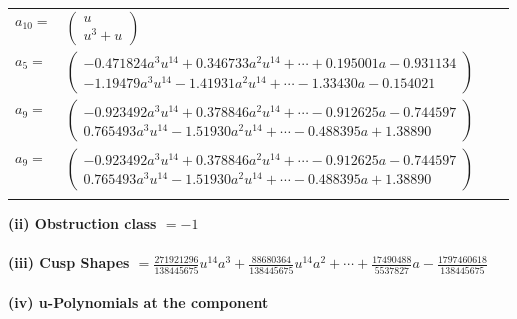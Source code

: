 \documentclass[1p]{elsarticle_modified}
\theoremstyle{definition}
\begin{document}
\begin{tabular}{m{7pt} m{180pt} m{7pt} m{180pt} }
\flushright $a_{10}=$&$\begin{pmatrix}u\\u^3+u\end{pmatrix}$ \\
\flushright $a_{5}=$&$\begin{pmatrix}-0.471824 a^{3} u^{14}+0.346733 a^{2} u^{14}+\cdots+0.195001 a-0.931134\\-1.19479 a^{3} u^{14}-1.41931 a^{2} u^{14}+\cdots-1.33430 a-0.154021\end{pmatrix}$ \\
\flushright $a_{9}=$&$\begin{pmatrix}-0.923492 a^{3} u^{14}+0.378846 a^{2} u^{14}+\cdots-0.912625 a-0.744597\\0.765493 a^{3} u^{14}-1.51930 a^{2} u^{14}+\cdots-0.488395 a+1.38890\end{pmatrix}$\\ \flushright $a_{9}=$&$\begin{pmatrix}-0.923492 a^{3} u^{14}+0.378846 a^{2} u^{14}+\cdots-0.912625 a-0.744597\\0.765493 a^{3} u^{14}-1.51930 a^{2} u^{14}+\cdots-0.488395 a+1.38890\end{pmatrix}$\\&\end{tabular}
\flushleft \textbf{(ii) Obstruction class $= -1$}\\~\\
\flushleft \textbf{(iii) Cusp Shapes $= \frac{271921296}{138445675} u^{14} a^3+\frac{88680364}{138445675} u^{14} a^2+\cdots+\frac{17490488}{5537827} a-\frac{1797460618}{138445675}$}\\~\\
\newpage\renewcommand{\arraystretch}{1}
\flushleft \textbf{(iv) u-Polynomials at the component}\newline \\
\end{document}
